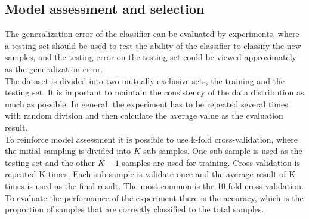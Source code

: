 \subsection{Model assessment and selection}
The generalization error of the classifier can be evaluated by experiments, where a testing set should be used to test the ability of the classifier to classify the new samples, and the testing error on the testing set could be viewed approximately as the generalization error.
\\
The dataset is divided into two mutually exclusive sets, the training and the testing set. It is important to maintain the consistency of the data distribution as much as possible. In general, the experiment has to be repeated several times with random division and then calculate the average value as the evaluation result.
\\ \indent
To reinforce model assessment it is possible to use k-fold cross-validation, where the initial sampling is divided into $K$ sub-samples. One sub-sample is used as the testing set and the other $K-1$ samples are used for training. Cross-validation is repeated K-times. Each sub-sample is validate once and the average result of K times is used as the final result. The most common is the 10-fold cross-validation.
\\ \indent
To evaluate the performance of the experiment there is the accuracy, which is the proportion of samples that are correctly classified to the total samples.

\newpage
